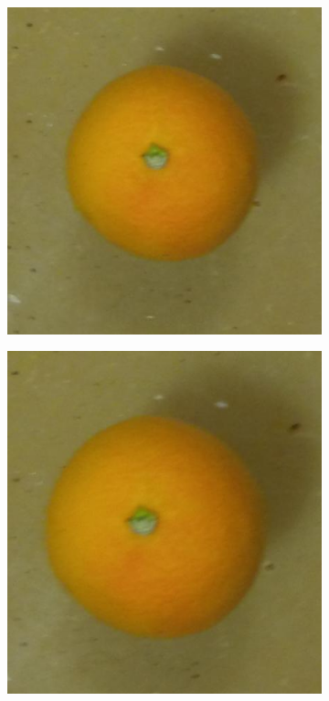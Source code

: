 \documentclass {udthesis}
\begin{document}
\begin{figure}
\begin{subfigure}[]{0.12\textwidth}
      \caption{}
  \end{subfigure}
  \begin{subfigure}[]{0.12\textwidth}
      \includegraphics[width=\textwidth]{orange4_obj_11/orange4_011_16}
      \caption{}
  \end{subfigure}
  \begin{subfigure}[]{0.12\textwidth}
      \includegraphics[width=\textwidth]{orange4_obj_11/orange4_011_14}

\end{subfigure}
\end{figure}
\end{document}
